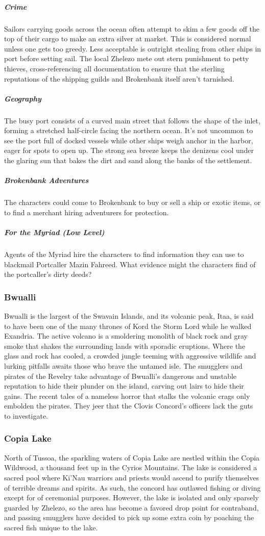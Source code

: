 \documentclass[10pt,a4paper,twoside,bg=print,twocolumn,openany,nodeprecatedcode]{dndbook}
\begin{document}
\subparagraph{Crime}
Sailors carrying goods across the ocean often attempt to skim a few goods off the top of their cargo to make an extra silver at market. This is considered normal unless one gets too greedy. Less acceptable is outright stealing from other ships in port before setting sail. The local Zhelezo mete out stern punishment to petty thieves, cross-referencing all documentation to ensure that the sterling reputations of the shipping guilds and Brokenbank itself aren't tarnished.

\subparagraph{Geography}
The busy port consists of a curved main street that follows the shape of the inlet, forming a stretched half-circle facing the northern ocean. It's not uncommon to see the port full of docked vessels while other ships weigh anchor in the harbor, eager for spots to open up. The strong sea breeze keeps the denizens cool under the glaring sun that bakes the dirt and sand along the banks of the settlement.

\subparagraph{Brokenbank Adventures}
The characters could come to Brokenbank to buy or sell a ship or exotic items, or to find a merchant hiring adventurers for protection.

\subparagraph{For the Myriad (Low Level)}
Agents of the Myriad hire the characters to find information they can use to blackmail Portcaller Mazin Fahreed. What evidence might the characters find of the portcaller's dirty deeds?

\subsubsection{Bwualli}
Bwualli is the largest of the Swavain Islands, and its volcanic peak, Itaa, is said to have been one of the many thrones of Kord the Storm Lord while he walked Exandria. The active volcano is a smoldering monolith of black rock and gray smoke that shakes the surrounding lands with sporadic eruptions. Where the glass and rock has cooled, a crowded jungle teeming with aggressive wildlife and lurking pitfalls awaits those who brave the untamed isle. The smugglers and pirates of the Revelry take advantage of Bwualli's dangerous and unstable reputation to hide their plunder on the island, carving out lairs to hide their gains. The recent tales of a nameless horror that stalks the volcanic crags only embolden the pirates. They jeer that the Clovis Concord's officers lack the guts to investigate.

\subsubsection{Copia Lake}
North of Tussoa, the sparkling waters of Copia Lake are nestled within the Copia Wildwood, a thousand feet up in the Cyrios Mountains. The lake is considered a sacred pool where Ki'Nau warriors and priests would ascend to purify themselves of terrible dreams and spirits. As such, the concord has outlawed fishing or diving except for of ceremonial purposes. However, the lake is isolated and only sparsely guarded by Zhelezo, so the area has become a favored drop point for contraband, and passing smugglers have decided to pick up some extra coin by poaching the sacred fish unique to the lake.
\end{document}
